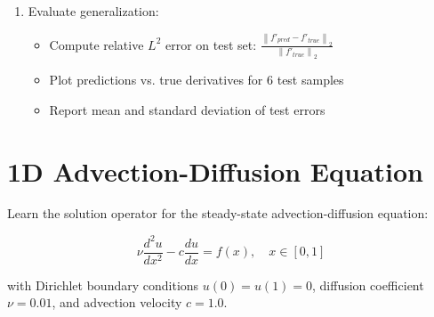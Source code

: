 \documentclass[11pt]{article}
\begin{document}
\begin{enumerate}
		\item[\textbf{f)}] Evaluate generalization:
		\begin{itemize}
			\item Compute relative $L^2$ error on test set: $\displaystyle\frac{\left\|f'_{pred} - f'_{true}\right\|_2}{\left\|f'_{true}\right\|_2}$
			\item Plot predictions vs. true derivatives for 6 test samples
			\item Report mean and standard deviation of test errors
		\end{itemize}
	\end{enumerate}
	
	\section{1D Advection-Diffusion Equation}
	Learn the solution operator for the steady-state advection-diffusion equation:
	
	\begin{equation*}
		\nu \frac{d^2u}{dx^2} - c \frac{du}{dx} = f(x), \quad x \in [0,1]
	\end{equation*}
	
	with Dirichlet boundary conditions $u(0) = u(1) = 0$, diffusion coefficient $\nu = 0.01$, and advection velocity $c = 1.0$.
	
\end{document}
